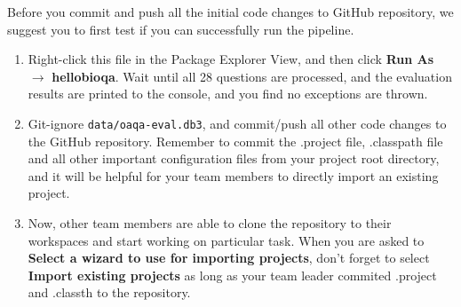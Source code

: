Before you commit and push all the initial code changes to GitHub repository, we
suggest you to first test if you can successfully run the pipeline.

\begin{enumerate}

\item Right-click this file in the Package Explorer View, and then click
\textbf{Run As} $\rightarrow$ \textbf{hellobioqa}. Wait until all 28 questions
are processed, and the evaluation results are printed to the console, and you
find no exceptions are thrown.

\item Git-ignore \texttt{data/oaqa-eval.db3}, and commit/push all other code
changes to the GitHub repository. Remember to commit the .project file,
.classpath file and all other important configuration files from your project
root directory, and it will be helpful for your team members to directly import
an existing project.

\item Now, other team members are able to clone the repository to their
workspaces and start working on particular task. When you are asked to
\textbf{Select a wizard to use for importing projects}, don't forget to select
\textbf{Import existing projects} as long as your team leader commited .project
and .classth to the repository.

\end{enumerate}
